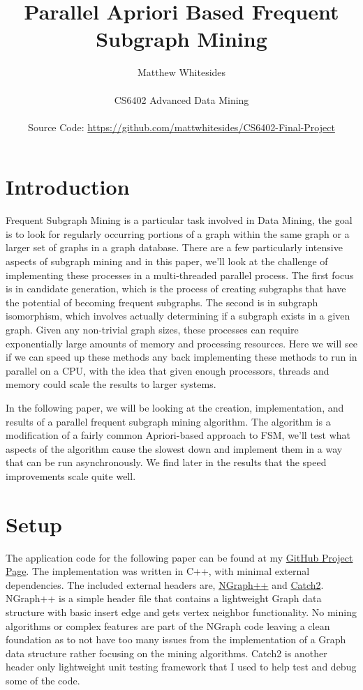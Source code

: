 \documentclass{article}
\title{Parallel Apriori Based Frequent Subgraph Mining}
\author{Matthew Whitesides\\\\
  \large CS6402 Advanced Data Mining\\\\
  \large Source Code: \href{https://github.com/mattwhitesides/CS6402-Final-Project}{https://github.com/mattwhitesides/CS6402-Final-Project}}
\begin{document}
\maketitle

\section{Introduction}
Frequent Subgraph Mining is a particular task involved in Data Mining, the goal is to look for regularly occurring portions of a graph within the same graph or a larger set of graphs in a graph database. There are a few particularly intensive aspects of subgraph mining and in this paper, we'll look at the challenge of implementing these processes in a multi-threaded parallel process. The first focus is in candidate generation, which is the process of creating subgraphs that have the potential of becoming frequent subgraphs. The second is in subgraph isomorphism, which involves actually determining if a subgraph exists in a given graph. Given any non-trivial graph sizes, these processes can require exponentially large amounts of memory and processing resources. Here we will see if we can speed up these methods any back implementing these methods to run in parallel on a CPU, with the idea that given enough processors, threads and memory could scale the results to larger systems. 

In the following paper, we will be looking at the creation, implementation, and results of a parallel frequent subgraph mining algorithm. The algorithm is a modification of a fairly common Apriori-based approach to FSM, we'll test what aspects of the algorithm cause the slowest down and implement them in a way that can be run asynchronously. We find later in the results that the speed improvements scale quite well. 

\section{Setup}
The application code for the following paper can be found at my \href{https://github.com/mattwhitesides/CS6402-Final-Project}{GitHub Project Page}. The implementation was written in C++, with minimal external dependencies. The included external headers are, \href{https://math.nist.gov/~RPozo/graph/ngraph_index.html}{NGraph++} and \href{https://github.com/catching/Catch2}{Catch2}. NGraph++ is a simple header file that contains a lightweight Graph data structure with basic insert edge and gets vertex neighbor functionality. No mining algorithms or complex features are part of the NGraph code leaving a clean foundation as to not have too many issues from the implementation of a Graph data structure rather focusing on the mining algorithms. Catch2 is another header only lightweight unit testing framework that I used to help test and debug some of the code.
\end{document}
